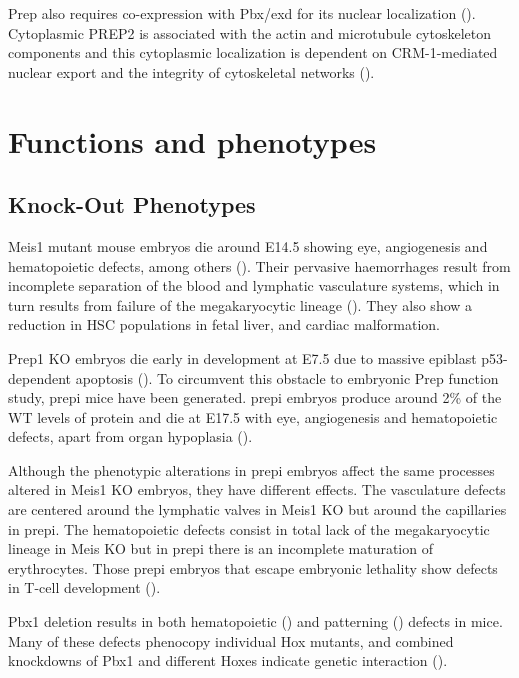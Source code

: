Prep also requires co-expression with Pbx/exd for its nuclear localization (\cite{Berthelsen1999}). Cytoplasmic PREP2 is associated with the actin and microtubule cytoskeleton components and this cytoplasmic localization is dependent on CRM-1-mediated nuclear export and the integrity of cytoskeletal networks (\cite{Haller2004}).


\section{Functions and phenotypes}

\subsection{Knock-Out Phenotypes}

Meis1 mutant mouse embryos die around E14.5 showing eye, angiogenesis and hematopoietic defects, among others (\cite{Hisa2004, Azcoitia2005}). Their pervasive haemorrhages result from incomplete separation of the blood and lymphatic vasculature systems, which in turn results from failure of the megakaryocytic lineage (\cite{Carramolino2010}). They also show a reduction in \ac{HSC} populations in fetal liver, and cardiac malformation. %

Prep1 \ac{KO} embryos die early in development at E7.5 due to massive epiblast p53-dependent apoptosis (\cite{Fernandez-Diaz2010}). To circumvent this obstacle to embryonic Prep function study, \ac{prepi} mice have been generated. \ac{prepi} embryos produce around 2\% of the \ac{WT} levels of protein and die at E17.5 with eye, angiogenesis and hematopoietic defects, apart from organ hypoplasia (\cite{Ferretti2006, DiRosa2007}).  

Although the phenotypic alterations in \ac{prepi} embryos affect the same processes altered in Meis1 \ac {KO} embryos, they have different effects. The vasculature defects are centered around the lymphatic valves in Meis1 \ac{KO} but around the capillaries in \ac{prepi}. The hematopoietic defects consist in total lack of the megakaryocytic lineage in Meis \ac{KO} but in  \ac{prepi} there is an incomplete maturation of erythrocytes. Those \ac{prepi} embryos that escape embryonic lethality show defects in T-cell development (\cite{Penkov2005}). 

Pbx1 deletion results in both hematopoietic (\cite{DiMartino2001}) and patterning (\cite{Selleri2001, Moens2006}) defects in mice. Many of these defects phenocopy individual Hox mutants, and combined knockdowns of Pbx1 and different Hoxes indicate genetic interaction (\cite{Moens2006}).

